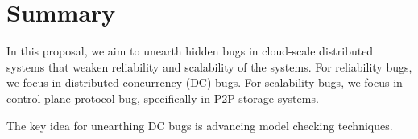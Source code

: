 \chapter{Summary}
\label{chp-con}

In this proposal, we aim to unearth hidden bugs in cloud-scale distributed
systems that weaken reliability and scalability of the systems. For reliability
bugs, we focus in distributed concurrency (DC) bugs. For scalability bugs, we
focus in control-plane protocol bug, specifically in P2P storage systems.

The key idea for unearthing DC bugs is advancing model checking techniques. 

